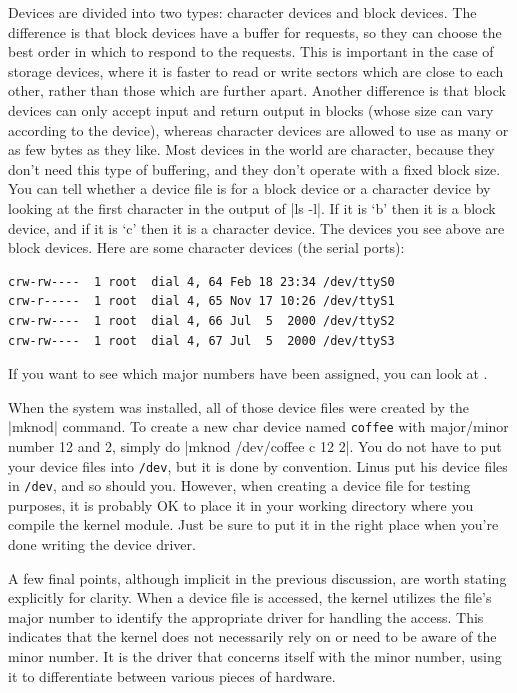 \documentclass[10pt, oneside]{book}
\begin{document}
Devices are divided into two types: character devices and block devices.
The difference is that block devices have a buffer for requests, so they can choose the best order in which to respond to the requests.
This is important in the case of storage devices, where it is faster to read or write sectors which are close to each other, rather than those which are further apart.
Another difference is that block devices can only accept input and return output in blocks (whose size can vary according to the device), whereas character devices are allowed to use as many or as few bytes as they like.
Most devices in the world are character, because they don't need this type of buffering, and they don't operate with a fixed block size.
You can tell whether a device file is for a block device or a character device by looking at the first character in the output of \sh|ls -l|.
If it is `b' then it is a block device, and if it is `c' then it is a character device.
The devices you see above are block devices. Here are some character devices (the serial ports):

\begin{verbatim}
crw-rw----  1 root  dial 4, 64 Feb 18 23:34 /dev/ttyS0
crw-r-----  1 root  dial 4, 65 Nov 17 10:26 /dev/ttyS1
crw-rw----  1 root  dial 4, 66 Jul  5  2000 /dev/ttyS2
crw-rw----  1 root  dial 4, 67 Jul  5  2000 /dev/ttyS3
\end{verbatim}

If you want to see which major numbers have been assigned, you can look at .

When the system was installed, all of those device files were created by the \sh|mknod| command.
To create a new char device named \verb|coffee| with major/minor number 12 and 2, simply do \sh|mknod /dev/coffee c 12 2|.
You do not have to put your device files into \verb|/dev|, but it is done by convention.
Linus put his device files in \verb|/dev|, and so should you.
However, when creating a device file for testing purposes, it is probably OK to place it in your working directory where you compile the kernel module.
Just be sure to put it in the right place when you're done writing the device driver.

A few final points, although implicit in the previous discussion, are worth stating explicitly for clarity.
When a device file is accessed, the kernel utilizes the file's major number to identify the appropriate driver for handling the access.
This indicates that the kernel does not necessarily rely on or need to be aware of the minor number.
It is the driver that concerns itself with the minor number, using it to differentiate between various pieces of hardware.
\end{document}

